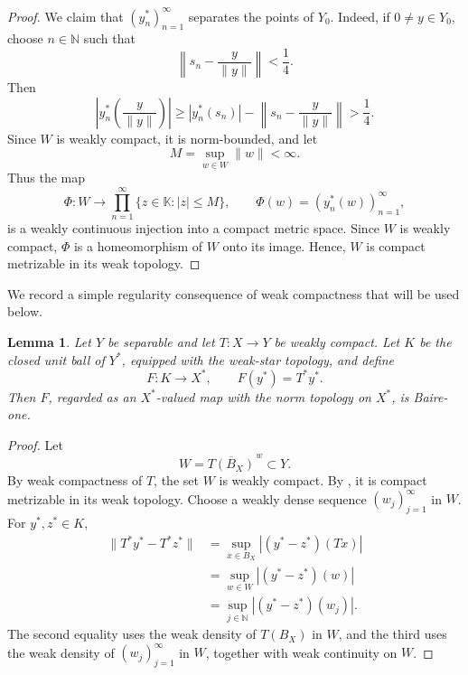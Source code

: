 \documentclass[11pt,reqno]{amsart}
\makeatletter
\theoremstyle{plain}
\newtheorem{lemma}[lemma]{Lemma}
\theoremstyle{definition}
\newcommand{\N}{\mathbb N}
\newcounter{problempaper}
\newenvironment{problempaperbody}{%
  \setcounter{subsection}{0}%
  \setcounter{subsubsection}{0}%
  \setcounter{paragraph}{0}%
  \renewcommand{\thesubsection}{\arabic{subsection}}%
  \renewcommand{\thesubsubsection}{\thesubsection.\arabic{subsubsection}}%
  \renewcommand{\theparagraph}{\thesubsubsection.\arabic{paragraph}}%
  \let\problem@outersection\section
  \let\problem@outersubsection\subsection
  \let\problem@outersubsubsection\subsubsection
  \let\problem@outerparagraph\paragraph
  \let\section\problem@papersection
  \let\subsection\problem@papersubsection
  \let\subsubsection\problem@papersubsubsection
}{%
  \let\section\problem@outersection
  \let\subsection\problem@outersubsection
  \let\subsubsection\problem@outersubsubsection
  \let\paragraph\problem@outerparagraph
}
\newcommand{\problem@target}[2]{%
  \hypertarget{problem-\theproblempaper-#1-#2}{}%
}
\newcommand{\problem@paperheading}[3]{%
  \par\bigskip
  \problem@target{#1}{#2}%
  \noindent{\large\bfseries #2.\quad #3\par}%
  \nobreak\smallskip
}
\newcommand{\problem@papersubheading}[3]{%
  \par\medskip
  \problem@target{#1}{#2}%
  \noindent{\normalsize\bfseries #2.\quad #3\par}%
  \nobreak\smallskip
}
\newcommand{\problem@papersubsubheading}[3]{%
  \par\smallskip
  \problem@target{#1}{#2}%
  \noindent{\normalsize\itshape #2.\quad #3.\ }%
}
\def\problem@papersection{%
  \@ifstar{\problem@papersectionstar}{\problem@papersectionnostar}%
}
\def\problem@papersectionstar#1{%
  \par\bigskip\noindent{\large\bfseries #1\par}\nobreak\smallskip
}
\def\problem@papersectionnostar#1{%
  \refstepcounter{subsection}%
  \setcounter{subsubsection}{0}%
  \setcounter{paragraph}{0}%
  \problem@paperheading{section}{\thesubsection}{#1}%
  \problem@writecontentsline{section}{\thesubsection}{#1}%
}
\def\problem@papersubsection{%
  \@ifstar{\problem@papersubsectionstar}{\problem@papersubsectionnostar}%
}
\def\problem@papersubsectionstar#1{%
  \par\medskip\noindent{\normalsize\bfseries #1\par}\nobreak\smallskip
}
\def\problem@papersubsectionnostar#1{%
  \refstepcounter{subsubsection}%
  \setcounter{paragraph}{0}%
  \problem@papersubheading{subsection}{\thesubsubsection}{#1}%
  \problem@writecontentsline{subsection}{\thesubsubsection}{#1}%
}
\def\problem@papersubsubsection{%
  \@ifstar{\problem@papersubsubsectionstar}{\problem@papersubsubsectionnostar}%
}
\def\problem@papersubsubsectionstar#1{%
  \par\smallskip\noindent{\normalsize\itshape #1.\ }%
}
\def\problem@papersubsubsectionnostar#1{%
  \refstepcounter{paragraph}%
  \problem@papersubsubheading{subsubsection}{\theparagraph}{#1}%
  \problem@writecontentsline{subsubsection}{\theparagraph}{#1}%
}
\newcommand{\problem@writecontentsline}[3]{%
  \begingroup
  \protected@write\@auxout{}{%
    \string\problemcontentsentry{\theproblempaper}{#1}{#2}{#3}{\thepage}%
  }%
  \endgroup
}
\newcommand{\problemcontentsentry}[5]{%
  \@ifundefined{problemcontents@#1}{%
    \expandafter\gdef\csname problemcontents@#1\endcsname{}%
  }{}%
  \expandafter\g@addto@macro\csname problemcontents@#1\endcsname{%
    \problemcontentsline{#1}{#2}{#3}{#4}{#5}%
  }%
}
\newcommand{\problemcontentslink}[4]{%
  \hyperlink{problem-#1-#2-#3}{#4}%
}
\newcommand{\problemcontentsline}[5]{%
  \ifstrequal{#2}{section}{%
    \par\noindent
    \problemcontentslink{#1}{#2}{#3}{\makebox[2.5em][l]{#3}#4}%
    \nobreak\dotfill
    \problemcontentslink{#1}{#2}{#3}{#5}\par
  }{%
    \ifstrequal{#2}{subsection}{%
      \par\noindent\hspace*{1.5em}%
      \problemcontentslink{#1}{#2}{#3}{\makebox[3.5em][l]{#3}#4}%
      \nobreak\dotfill
      \problemcontentslink{#1}{#2}{#3}{#5}\par
    }{%
      \par\noindent\hspace*{3em}%
      \problemcontentslink{#1}{#2}{#3}{\makebox[4.5em][l]{#3}#4}%
      \nobreak\dotfill
      \problemcontentslink{#1}{#2}{#3}{#5}\par
    }%
  }%
}
\makeatother
\begin{document}
\begin{problempaperbody}
\begin{proof}
We claim that $(y_n^*)_{n=1}^{\infty}$ separates the points of $Y_0$. Indeed, if $0\ne y\in Y_0$, choose $n\in\N$ such that
\begin{equation*}
        \left\|s_n-\frac{y}{\|y\|}\right\|<\frac{1}{4}.
\end{equation*}
Then
\begin{equation*}
        \left|y_n^*\left(\frac{y}{\|y\|}\right)\right|\geq |y_n^*(s_n)|-\left\|s_n-\frac{y}{\|y\|}\right\|>\frac{1}{4}.
\end{equation*}
Since $W$ is weakly compact, it is norm-bounded, and let
\begin{equation*}
        M=\sup_{w\in W}\|w\|<\infty.
\end{equation*}
Thus the map
\begin{equation*}
        \Phi\colon W\to \prod_{n=1}^{\infty}\{z\in\mathbb K:|z|\leq M\}, \qquad \Phi(w)=(y_n^*(w))_{n=1}^{\infty},
\end{equation*}
is a weakly continuous injection into a compact metric space. Since $W$ is weakly compact, $\Phi$ is a homeomorphism of $W$ onto its image. Hence, $W$ is compact metrizable in its weak topology.
\end{proof}

We record a simple regularity consequence of weak compactness that will be used
below.

\begin{lemma}
\label{p5:lem:baire-one-adjoint}
Let $Y$ be separable and let $T\colon X\to Y$ be weakly compact. Let $K$ be
the closed unit ball of $Y^*$, equipped with the weak-star topology, and define
\begin{equation*}
        F\colon K\to X^*, \qquad F(y^*)=T^*y^*.
\end{equation*}
Then $F$, regarded as an $X^*$-valued map with the norm topology on $X^*$, is
Baire-one.
\end{lemma}

\begin{proof}
Let
\begin{equation*}
        W=\overline{T(B_X)}^{\,w}\subset Y .
\end{equation*}
By weak compactness of $T$, the set $W$ is weakly compact. By
, it is compact metrizable in its weak
topology. Choose a weakly dense sequence $(w_j)_{j=1}^{\infty}$ in $W$. For
$y^*,z^*\in K$,
\begin{equation*}
\begin{aligned}
        \|T^*y^*-T^*z^*\|
        &= \sup_{x\in B_X}|(y^*-z^*)(Tx)|  \\
        &= \sup_{w\in W}|(y^*-z^*)(w)|     \\
        &= \sup_{j\in\mathbb N}|(y^*-z^*)(w_j)|.
\end{aligned}
\end{equation*}
The second equality uses the weak density of $T(B_X)$ in $W$, and the third uses
the weak density of $(w_j)_{j=1}^{\infty}$ in $W$, together with weak continuity
on $W$.


\end{proof}
\end{problempaperbody}
\end{document}
